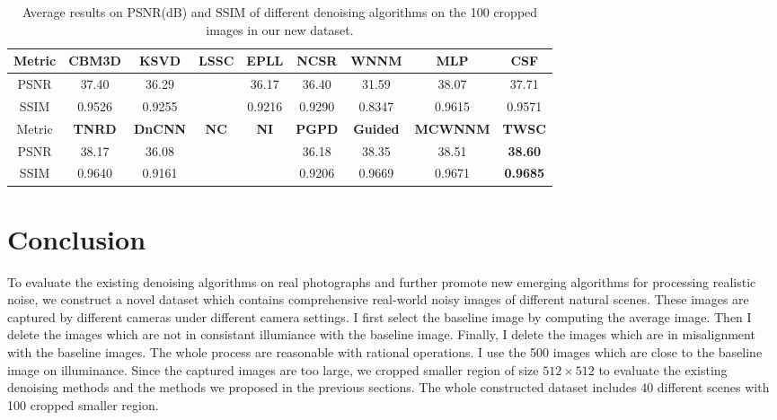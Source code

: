 \begin{table}[hbp]
\caption{Average results on PSNR(dB) and SSIM of different denoising algorithms on the 100 cropped images in our new dataset.}
\scriptsize
\label{tab6-1}
\begin{center}
\renewcommand\arraystretch{1.2}
\begin{tabular*}{1\textwidth}{@{\extracolsep{\fill}}ccccccccc}
\hline
Metric
&
\textbf{CBM3D}
&
\textbf{KSVD}
&
\textbf{LSSC}
&
\textbf{EPLL}
&
\textbf{NCSR}
&
\textbf{WNNM}
&
\textbf{MLP}
&
\textbf{CSF}
\\
\hline
PSNR & 37.40 & 36.29 &  & 36.17 & 36.40 & 31.59 & 38.07 & 37.71
\\
\hline
SSIM & 0.9526 & 0.9255 &  & 0.9216 & 0.9290 & 0.8347 & 0.9615 & 0.9571
\\
\hline
Metric
&
\textbf{TNRD}
&
\textbf{DnCNN}
&
\textbf{NC}
&
\textbf{NI}
&
\textbf{PGPD}
&
\textbf{Guided}
&
\textbf{MCWNNM}
&
\textbf{TWSC}
\\
\hline
PSNR & 38.17 & 36.08 &  &  & 36.18 & 38.35 & 38.51 & \textbf{38.60}
\\
\hline
SSIM & 0.9640 & 0.9161 &  &  & 0.9206 & 0.9669 & 0.9671 & \textbf{0.9685}
\\
\hline
\end{tabular*}
\end{center}
\end{table}




\section{Conclusion}

To evaluate the existing denoising algorithms on real photographs and further promote new emerging algorithms for processing realistic noise, we construct a novel dataset which contains comprehensive real-world noisy images of different natural scenes. These images are captured by different cameras under different camera settings. I first select the baseline image by computing the average image. Then I delete the images which are not in consistant illumiance with the baseline image. Finally, I delete the images which are in misalignment with the baseline images. The whole process are reasonable with rational operations. I use the 500 images which are close to the baseline image on illuminance. Since the captured images are too large, we cropped smaller region of size $512\times512$ to evaluate the existing denoising methods and the methods we proposed in the previous sections. The whole constructed dataset includes 40 different scenes with 100 cropped smaller region.

